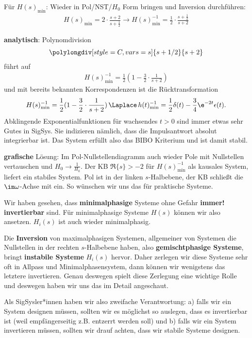 \begin{Ansatz}
Für $H(s)_\mathrm{min}$:
Wieder in Pol/NST/$H_0$ Form bringen und Inversion durchführen:
\begin{align}
\label{eq:4926427BA9_Hsmininv_series}
H(s)_\mathrm{min} = 2\cdot\frac{s+2}{s+\frac{1}{2}}\rightarrow
H(s)_\mathrm{min}^{-1} = \frac{1}{2}\cdot\frac{s+\frac{1}{2}}{s+2}
\end{align}
\end{Ansatz}

\begin{ExCalc}
\textbf{analytisch}: Polynomdivision
$$\polylongdiv[style=C, vars=s]{s+1/2}{s+2}$$
führt auf
\begin{align}
\label{eq:4926427BA9_Hsmininv_parallel}
H(s)_\mathrm{min}^{-1} = \frac{1}{2} (1-\frac{3}{2}\cdot\frac{1}{s+2})
\end{align}
und mit bereits bekannten Korrespondenzen ist die Rücktransformation
\begin{align}
H(s)_\mathrm{min}^{-1} = \frac{1}{2} (1-\frac{3}{2}\cdot\frac{1}{s+2})
\,\Laplace\,
h(t)_\mathrm{min}^{-1} = \frac{1}{2}\delta(t) - \frac{3}{4}\e^{-2 t}\epsilon(t).
\end{align}
Abklingende Exponentialfunktionen für wachsendes $t>0$ sind immer etwas sehr
Gutes in SigSys. Sie indizieren nämlich, dass die Impulsantwort absolut
integrierbar ist. Das System erfüllt also das BIBO Kriterium und ist damit stabil.

\noindent\textbf{grafische} Lösung:
Im Pol-Nullstellendiagramm auch wieder Pole mit Nullstellen vertauschen
und $H_0\to\frac{1}{H_0}$. Der KB $\Re\{s\}>-2$ für $H(s)_\mathrm{min}^{-1}$
als kausales System, liefert ein stabiles System. Pol ist in der linken $s$-Halbebene,
der KB schließt die $\im\omega$-Achse mit ein. So wünschen wir uns das für
praktische Systeme.
\end{ExCalc}


\begin{Loesung}
Wir haben gesehen, dass \textbf{minimalphasige} Systeme ohne Gefahr \textbf{immer! invertierbar}
sind. Für minimalphasige Systeme $H(s)$
können wir also  ansetzen.
$H_i(s)$ ist auch wieder minimalphasig.

Die \textbf{Inversion} von maximalphasigen Systemen, allgemeiner von Systemen
die Nullstellen in der rechten $s$-Halbebene haben, also \textbf{gemischtphasige Systeme},
bringt \textbf{instabile Systeme} $H_i(s)$ hervor.
Daher zerlegen wir diese Systeme sehr oft in Allpass und Minimalphasensystem,
dann können wir wenigstens das letztere invertieren. Genau deswegen spielt
diese Zerlegung eine wichtige Rolle und deswegen haben wir uns das im Detail
angeschaut.

Als SigSysler*innen haben wir also zweifache Verantwortung: a) falls wir
ein System designen müssen, sollten wir es möglichst so auslegen, dass es
invertierbar ist (weil empfängerseitig z.B. entzerrt werden soll)
und b) falls wir ein System invertieren müssen, sollten wir
drauf achten, dass wir stabile Systeme designen.

\end{Loesung}


